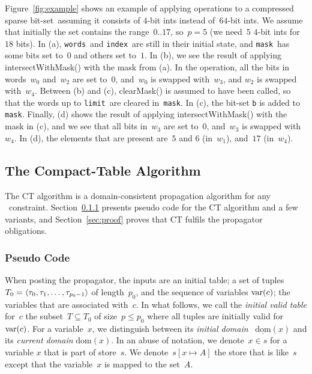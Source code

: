 \documentclass[a4paper,11pt]{article}
\theoremstyle{definition}
\newcommand{\T}[1]{\texttt{#1}}
\newcommand{\Secref}[1]{Section~\ref{#1}}
\newcommand{\Table}{\Constraint{Table}}
\newcommand{\Dom}[1]{\text{dom}({#1})}
\newcommand{\Dominit}[1]{\underline{\text{dom}}(#1)}
\newcommand{\Words}{\texttt{words}}
\newcommand{\Index}{\texttt{index}}
\newcommand{\Mask}{\texttt{mask}}
\newcommand{\Limit}{\texttt{limit}}
\newcommand{\bitset}[0]{compressed sparse bit-set}
\numberwithin{equation}{section}
\begin{document}
Figure~\ref{fig:example} shows an example of applying operations to a
\bitset~assuming it consists of $4$-bit ints instead of~$64$-bit ints.
We assume that initially the set contains the range~$0..17$, so~$p = 5$
(we need~$5$ $4$-bit ints for~$18$ bits). In (a), \Words~and \Index~are
still in their initial state, and \Mask~has some bits set to~$0$ and others
set to~$1$. In (b), we see the result of applying intersectWithMask() with
the mask from (a). In the operation, all the bits in words~$w_0$
and~$w_2$ are set to~$0$, and~$w_0$ is swapped with~$w_3$, and $w_2$
is swapped with~$w_4$.
Between (b) and (c), clearMask() is assumed to have been called,
so that the words up to \Limit~are cleared in~\Mask.
In (c), the bit-set \T{b} is added to \Mask.
Finally, (d) shows the result of applying intersectWithMask() with
the mask in (c), and we see that all bits in~$w_3$ are set to~$0$,
and~$w_3$ is swapped with~$w_4$. In (d), the elements that are present
are~$5$ and $6$ (in~$w_1$), and~$17$ (in~$w_4$).




\subsection{The Compact-Table Algorithm}
\label{sec:ct}
The CT algorithm is a domain-consistent propagation
algorithm for any \Table~constraint. \Secref{ct:pseudo}
presents pseudo code for the CT algorithm and a few variants,
and \Secref{sec:proof} proves that CT fulfils the propagator
obligations.

\subsubsection{Pseudo Code}
\label{ct:pseudo}

When posting the propagator, the inputs are an initial table;
a set of tuples $T_0 = \left\langle\tau_0, \tau_1, \ldots, \tau_{p_0-1}\right\rangle$ of
length~$p_0$, and the sequence of variables $\text{var}(c)$;
the variables that are associated with~$c$.
In what follows, we call the \emph{initial valid table}
for~$c$ the subset~$T \subseteq T_0$ of size~$p \leq p_0$ where all
tuples are initially valid for~$\text{var}(c)$.
For a variable~$x$, we distinguish between its \emph{initial domain}
~$\Dominit{x}$ and its \emph{current domain} $\Dom{x}$.
In an abuse of notation, we denote~$x \in s$ for a variable
$x$ that is part of store~$s$. We denote~$s[x \mapsto A]$
the store that is like~$s$ except that the variable~$x$ is mapped
to the set~$A$.
\end{document}

